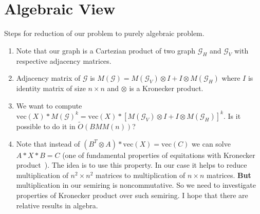 \section{Algebraic View}

Steps for reduction of our problem to purely algebraic problem.
\begin{enumerate}
\item Note that our graph is a Cartezian product of two graph $\mathcal{G}_H$ and $\mathcal{G}_V$ with respective adjacency matrices.
\item Adjacency matrix of $\mathcal{G}$ is $M(\mathcal{G}) = M(\mathcal{G}_V) \otimes I + I \otimes M(\mathcal{G}_H)$ where $I$ is identity matrix of size $n \times n$ and $\otimes$ is a Kronecker product.
\item We want to compute $\text{vec}(X)*M(\mathcal{G})^k = \text{vec}(X)*[M(\mathcal{G}_V) \otimes I + I \otimes M(\mathcal{G}_H)]^k$. Is it possible to do it in $\widetilde{O}(BMM(n))$?
\item Note that instead of $(B^T \otimes A) * \text{vec}(X) = \text{vec}(C)$ we can solve $A*X*B = C$ (one of fundamental properties of equitations with Kronecker product~\cite{schacke2004kronecker}).
The idea is to use this property.
In our case it helps to reduce multiplication of $n^2 \times n^2$ matrices to multiplication of $n \times n$ matrices.
\textbf{But} multiplication in our semiring is noncommutative.
So we need to investigate properties of Kronecker product over such semiring. 
I hope that there are relative results in algebra.
\end{enumerate}


